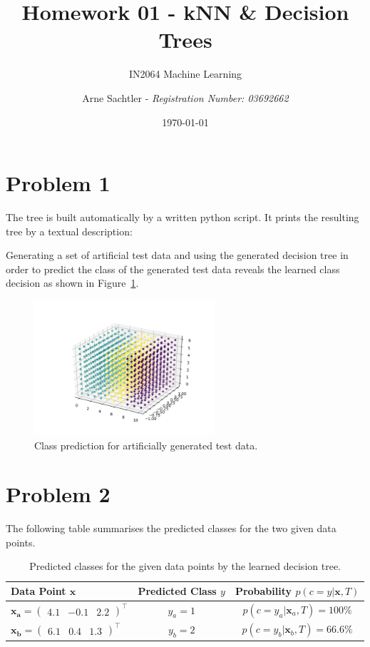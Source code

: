 \documentclass{scrartcl}
\title{Homework 01 - kNN \& Decision Trees}
\author{Arne Sachtler - \textit{Registration Number: 03692662}}
\date{\today}
\subtitle{IN2064 Machine Learning}
\begin{document}
\maketitle
	
\section{Problem 1}
The tree is built automatically by a written python script. It prints the resulting tree by a textual description:


Generating a set of artificial test data and using the generated decision tree in order to predict the class of the generated test data reveals the learned class decision as shown in Figure~\ref{fig:tree}.

\begin{figure}[h]
	\centering
	\includegraphics[height=5cm]{figure_tree.png}
	\caption{Class prediction for artificially generated test data.}
	\label{fig:tree}
\end{figure}

\section{Problem 2}
The following table summarises the predicted classes for the two given data points.

\begin{table}[h]
	\centering

	\begin{tabular}{l|c|c}
	\hline

	\hline
	\textbf{Data Point} $\mathbf{x}$ & \textbf{Predicted Class} $y$ & \textbf{Probability} $p(c = y | \mathbf{x}, T)$\\
	\hline
		 $\mathbf{x_a} = \begin{pmatrix}
		 	4.1 & -0.1 & 2.2
		 \end{pmatrix}^\top$& $y_a = 1$ & $p(c = y_a | \mathbf{x}_a, T) = 100\% $\\
	\hline
		$\mathbf{x_b} = \begin{pmatrix}
			6.1 & 0.4 & 1.3
		\end{pmatrix}^\top$ & $y_b = 2$ & $p(c = y_b | \mathbf{x}_b, T) = 66.6\% $\\

	\hline
	\end{tabular}
	\caption{Predicted classes for the given data points by the learned decision tree.}
	\label{tab:class_predictions}
\end{table}
\end{document}
